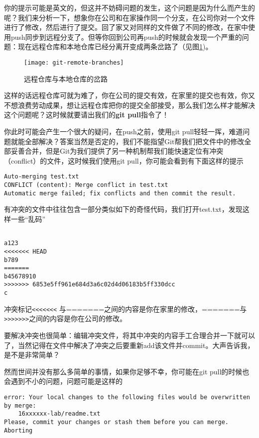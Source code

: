 你的提示可能是英文的，但这并不妨碍问题的发生，这个问题是因为什么而产生的呢？我们来分析一下，想象你在公司和在家操作同一个分支，在公司你对一个文件进行了修改，然后进行了提交。回了家又对同样的文件做了不同的修改，在家中使用push同步到远程分支了。但等你回到公司再push的时候就会发现一个严重的问题：现在远程仓库和本地仓库已经分离开变成两条岔路了（见图\ref{git-remote-branches})。

\begin{figure}[htbp]
  \centering
  \texttt{[image: git-remote-branches]}
  \caption{远程仓库与本地仓库的岔路}\label{git-remote-branches}
\end{figure}

这样的话远程仓库可就为难了，你在公司的提交有效，在家里的提交也有效，你又不想浪费劳动成果，想让远程仓库把你的提交全部接受，那么我们怎么样才能解决这个问题呢？这时候就要请出我们的\textbf{git pull}指令了！

你此时可能会产生一个很大的疑问，在push之前，使用git pull轻轻一挥，难道问题就能全部解决？答案当然是否定的，我们不能指望Git帮我们把文件中的修改全部妥善合并，但是Git为我们提供了另一种机制帮我们能快速定位有冲突（conflict）的文件，这时候我们使用git pull，你可能会看到有下面这样的提示

\begin{verbatim}
Auto-merging test.txt
CONFLICT (content): Merge conflict in test.txt
Automatic merge failed; fix conflicts and then commit the result.
\end{verbatim}

有冲突的文件中往往包含一部分类似如下的奇怪代码，我们打开test.txt，发现这样一些“乱码”

\begin{verbatim}

a123
<<<<<<< HEAD
b789
=======
b45678910
>>>>>>> 6853e5ff961e684d3a6c02d4d06183b5ff330dcc
c
\end{verbatim}

冲突标记\verb|<<<<<<<| 与=======之间的内容是你在家里的修改，=======与\verb|>>>>>>>|之间的内容是你在公司的修改。

要解决冲突也很简单：编辑冲突文件，将其中冲突的内容手工合理合并一下就可以了，当然记得在文件中解决了冲突之后要重新add该文件并commit。大声告诉我，是不是非常简单？

然而世间并没有那么多简单的事情，如果你足够不幸，你可能在git pull的时候也会遇到不小的问题，问题可能是这样的

\begin{verbatim}
error: Your local changes to the following files would be overwritten by merge:
	16xxxxxx-lab/readme.txt
Please, commit your changes or stash them before you can merge.
Aborting
\end{verbatim}

